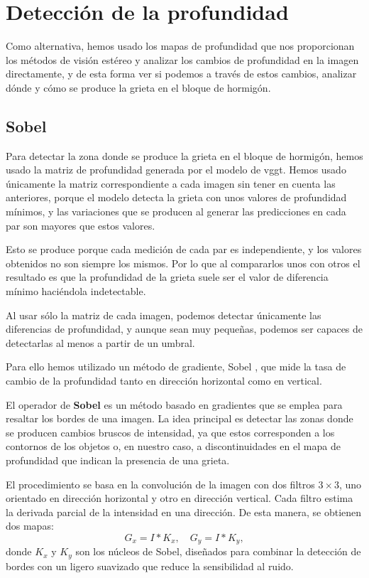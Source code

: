 \section{Detección de la profundidad}
Como alternativa, hemos usado los mapas de profundidad que nos proporcionan los métodos de visión estéreo y analizar los cambios de profundidad en la imagen directamente, y de esta forma ver si podemos a través de estos cambios, analizar dónde y cómo se produce la grieta en el bloque de hormigón.

\subsection{Sobel}

Para detectar la zona donde se produce la grieta en el bloque de hormigón, hemos usado la matriz de profundidad generada por el modelo de vggt. Hemos usado únicamente la matriz correspondiente a cada imagen sin tener en cuenta las anteriores, porque el modelo detecta la grieta con unos valores de profundidad mínimos, y las variaciones que se producen al generar las predicciones en cada par son mayores que estos valores. 

Esto se produce porque cada medición de cada par es independiente, y los valores obtenidos no son siempre los mismos. Por lo que al compararlos unos con otros el resultado es que la profundidad de la
grieta suele ser el valor de diferencia mínimo haciéndola indetectable.

Al usar sólo la matriz de cada imagen, podemos detectar únicamente las diferencias de profundidad, y aunque sean muy pequeñas, podemos ser capaces de detectarlas al menos a partir de un umbral.

Para ello hemos utilizado un método de gradiente, Sobel \cite{sobel1973}, que mide la tasa de cambio de la profundidad tanto en dirección horizontal como en vertical. 

El operador de \textbf{Sobel} \cite{sobel1973} es un método basado en gradientes que se emplea para resaltar los bordes de una imagen. La idea principal es detectar las zonas donde se producen cambios bruscos de intensidad, ya que estos corresponden a los contornos de los objetos o, en nuestro caso, a discontinuidades en el mapa de profundidad que indican la presencia de una grieta.

El procedimiento se basa en la convolución de la imagen con dos filtros \(3\times 3\), uno orientado en dirección horizontal y otro en dirección vertical. Cada filtro estima la derivada parcial de la intensidad en una dirección. De esta manera, se obtienen dos mapas: 
\[
G_x = I * K_x, \quad G_y = I * K_y,
\]
donde \(K_x\) y \(K_y\) son los núcleos de Sobel, diseñados para combinar la detección de bordes con un ligero suavizado que reduce la sensibilidad al ruido.

